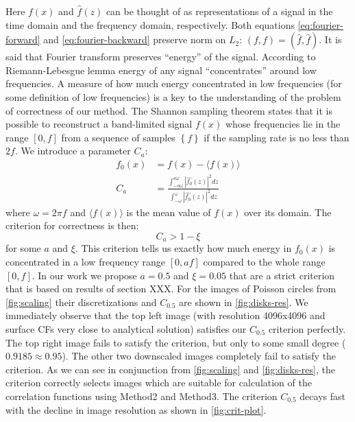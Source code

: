 \documentclass[reprint,amsmath,amssymb,aps,pre]{revtex4-1}
\begin{document}
Here $f(x)$ and $\hat{f}(z)$ can be thought of as representations of a signal in
the time domain and the frequency domain, respectively. Both equations
\cref{eq:fourier-forward} and \cref{eq:fourier-backward} preserve norm on $L_2$:
$(f, f) = (\hat{f}, \hat{f})$. It is said that Fourier transform preserves
``energy'' of the signal. According to Riemann-Lebesgue lemma \cite{bookHilb}
energy of any signal ``concentrates'' around low frequencies. A measure of how
much energy concentrated in low frequencies (for some definition of low
frequencies) is a key to the understanding of the problem of correctness of our
method. The Shannon sampling theorem \cite{bookHilb} states that it is possible
to reconstruct a band-limited signal $f(x)$ whose frequencies lie in the range
$[0, f]$ from a sequence of samples $\left\{f\right\}$ if the sampling rate is
no less than $2f$. We introduce a parameter $C_a$:
\begin{align*}
  f_0(x) &= f(x) - \langle f(x) \rangle \\
  C_a &= \frac{\int_{-a\omega}^{a\omega} |\hat{f_0}(z)|^2 dz}{\int_{-\omega}^{\omega} |\hat{f_0}(z)|^2 dz}
\end{align*}
where $\omega = 2\pi f$ and $\langle f(x) \rangle$ is the mean value of $f(x)$
over its domain. The criterion for correctness is then:
\begin{equation*}
  C_a > 1 - \xi
\end{equation*}
for some $a$ and $\xi$. This criterion tells us exactly how much energy in
$f_0(x)$ is concentrated in a low frequency range $[0, af]$ compared to the
whole range $[0, f]$. In our work we propose $a = 0.5$ and $\xi = 0.05$ that are
a strict criterion that is based on results of section XXX. For the images of
Poisson circles from \cref{fig:scaling} their discretizations and $C_{0.5}$ are
shown in \cref{fig:disks-res}. We immediately observe that the top left image
(with resolution 4096x4096 and surface CFs very close to analytical solution)
satisfies our $C_{0.5}$ criterion perfectly. The top right image fails to
satisfy the criterion, but only to some small degree ($0.9185 \approx 0.95$).
The other two downscaled images completely fail to satisfy the criterion. As we
can see in conjunction from \cref{fig:scaling} and \cref{fig:disks-res}, the
criterion correctly selects images which are suitable for calculation of the
correlation functions using Method2 and Method3. The criterion $C_{0.5}$ decays
fast with the decline in image resolution as shown in \cref{fig:crit-plot}.
\end{document}
